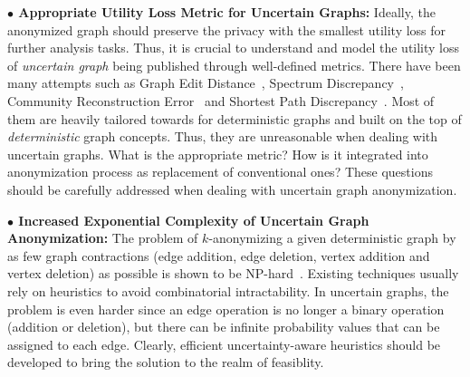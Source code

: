 \vspace{2mm}\hspace{-1em}
\textbf{$\bullet$ Appropriate Utility Loss Metric for Uncertain Graphs:} 
Ideally, the anonymized graph should preserve the privacy with the smallest utility loss for further analysis tasks. Thus, it is crucial to understand and model the utility loss of \emph{uncertain graph} being published through well-defined metrics. 
There have been many attempts such as Graph Edit Distance~\cite{Liu_Towards_2008}, Spectrum Discrepancy~\cite{Ying_Randomizing_2008}, Community Reconstruction Error~\cite{Wang2011} and Shortest Path Discrepancy~\cite{Liu_Privacy_2009}.  Most of them are heavily tailored towards for deterministic graphs and built on the top of \emph{deterministic} graph concepts. Thus, they are unreasonable when dealing with uncertain graphs. What is the appropriate metric? How is it integrated into anonymization process as replacement of conventional ones? These questions should be carefully addressed when dealing with uncertain graph anonymization. 

\vspace{2mm}\hspace{-1em}
\textbf{$\bullet$ Increased Exponential Complexity of Uncertain Graph Anonymization:}
The problem of $k$-anonymizing a given deterministic graph by as few graph contractions (edge addition, edge deletion, vertex addition and vertex deletion) as possible is shown to be NP-hard~\cite{Hartung_Theory_2015}. Existing techniques usually rely on heuristics to avoid combinatorial
intractability. In uncertain graphs, the problem is even harder since an edge operation is no longer a binary operation (addition or deletion), but there can be infinite probability values that can be assigned to each edge. Clearly, efficient uncertainty-aware heuristics should be developed to bring the solution to the realm of feasiblity. 



